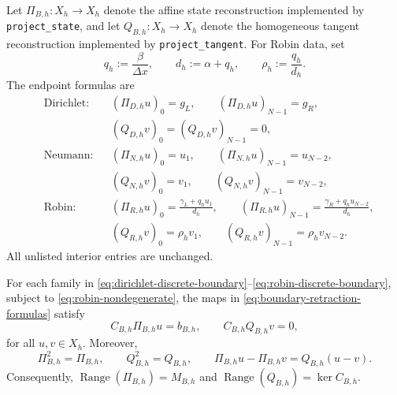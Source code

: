 Let $\Pi_{B,h}:X_h\to X_h$ denote the affine state reconstruction implemented by \texttt{project\_state}, and let $Q_{B,h}:X_h\to X_h$ denote the homogeneous tangent reconstruction implemented by \texttt{project\_tangent}.  For Robin data, set
\begin{equation}\label{eq:robin-reconstruction-constants}
q_h:=\frac{\beta}{\Delta x},\qquad d_h:=\alpha+q_h,\qquad \rho_h:=\frac{q_h}{d_h}.
\end{equation}
The endpoint formulas are
\begin{equation}\label{eq:boundary-retraction-formulas}
\begin{aligned}
&\text{Dirichlet:} &&(\Pi_{D,h}u)_0=g_L,\qquad (\Pi_{D,h}u)_{N-1}=g_R,\\
&&&(Q_{D,h}v)_0=(Q_{D,h}v)_{N-1}=0,\\
&\text{Neumann:} &&(\Pi_{N,h}u)_0=u_1,\qquad (\Pi_{N,h}u)_{N-1}=u_{N-2},\\
&&&(Q_{N,h}v)_0=v_1,\qquad (Q_{N,h}v)_{N-1}=v_{N-2},\\
&\text{Robin:} &&(\Pi_{R,h}u)_0=\frac{\gamma_L+q_hu_1}{d_h},\qquad (\Pi_{R,h}u)_{N-1}=\frac{\gamma_R+q_hu_{N-2}}{d_h},\\
&&&(Q_{R,h}v)_0=\rho_hv_1,\qquad (Q_{R,h}v)_{N-1}=\rho_hv_{N-2}.
\end{aligned}
\end{equation}
All unlisted interior entries are unchanged.

\begin{proposition}\label{prop:boundary-retractions}
For each family in \eqref{eq:dirichlet-discrete-boundary}--\eqref{eq:robin-discrete-boundary}, subject to \eqref{eq:robin-nondegenerate}, the maps in \eqref{eq:boundary-retraction-formulas} satisfy
\begin{equation}\label{eq:boundary-retraction-identities}
C_{B,h}\Pi_{B,h}u=b_{B,h},\qquad C_{B,h}Q_{B,h}v=0,
\end{equation}
for all $u,v\in X_h$.  Moreover,
\begin{equation}\label{eq:boundary-retraction-idempotence}
\Pi_{B,h}^2=\Pi_{B,h},\qquad Q_{B,h}^2=Q_{B,h},\qquad \Pi_{B,h}u-\Pi_{B,h}v=Q_{B,h}(u-v).
\end{equation}
Consequently, $\operatorname{Range}(\Pi_{B,h})=M_{B,h}$ and $\operatorname{Range}(Q_{B,h})=\ker C_{B,h}$.
\end{proposition}


